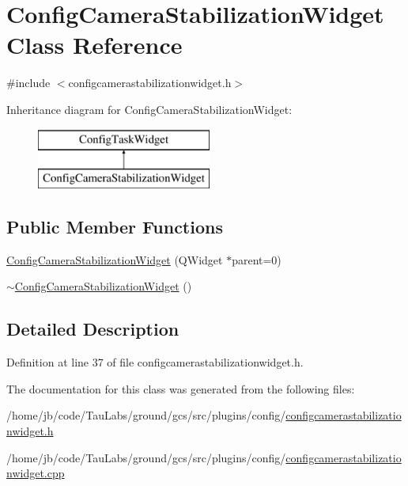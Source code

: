 \hypertarget{class_config_camera_stabilization_widget}{\section{\-Config\-Camera\-Stabilization\-Widget \-Class \-Reference}
\label{class_config_camera_stabilization_widget}
}


{\ttfamily \#include $<$configcamerastabilizationwidget.\-h$>$}

\-Inheritance diagram for \-Config\-Camera\-Stabilization\-Widget\-:\begin{figure}[H]
\begin{center}
\leavevmode
\includegraphics[height=2.000000cm]{class_config_camera_stabilization_widget}
\end{center}
\end{figure}
\subsection*{\-Public \-Member \-Functions}
\begin{DoxyCompactItemize}
\item 
\hyperlink{group___config_plugin_gaadc56cb83f84d7f34491592b248a111a}{\-Config\-Camera\-Stabilization\-Widget} (\-Q\-Widget $\ast$parent=0)
\item 
\hyperlink{group___config_plugin_ga6294d4eae582574215951c5213ae4e0b}{$\sim$\-Config\-Camera\-Stabilization\-Widget} ()
\end{DoxyCompactItemize}


\subsection{\-Detailed \-Description}


\-Definition at line 37 of file configcamerastabilizationwidget.\-h.



\-The documentation for this class was generated from the following files\-:\begin{DoxyCompactItemize}
\item 
/home/jb/code/\-Tau\-Labs/ground/gcs/src/plugins/config/\hyperlink{configcamerastabilizationwidget_8h}{configcamerastabilizationwidget.\-h}\item 
/home/jb/code/\-Tau\-Labs/ground/gcs/src/plugins/config/\hyperlink{configcamerastabilizationwidget_8cpp}{configcamerastabilizationwidget.\-cpp}\end{DoxyCompactItemize}
